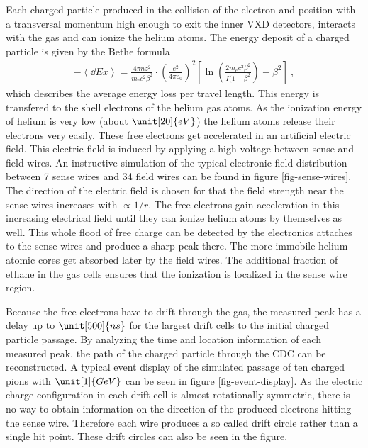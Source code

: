 Each charged particle produced in the collision of the electron and position with a transversal momentum high enough to exit the inner VXD detectors, interacts with the gas and can ionize the helium atoms. The energy deposit of a charged particle is given by the Bethe formula \cite{bethe}
\begin{align}
 - \left\langle \dd{E}{x} \right\rangle = \frac{4 \pi n z^2}{m_e c^2 \beta^2} \cdot \left( \frac{e^2}{4 \pi \varepsilon_0} \right)^2 \left[ \ln\left( \frac{2 m_e c^2 \beta^2}{I(1 - \beta^2} \right) - \beta^2 \right] \ , \label{form-bethe}
\end{align}
which describes the average energy loss per travel length. This energy is transfered to the shell electrons of the helium gas atoms. As the ionization energy of helium is very low (about $\unit[20]{eV}$) the helium atoms release their electrons very easily. These free electrons get accelerated in an artificial electric field. This electric field is induced by applying a high voltage between sense and field wires. An instructive simulation of the typical electronic field distribution between 7 sense wires and 34 field wires can be found in figure \ref{fig-sense-wires}. The direction of the electric field is chosen for that the field strength near the sense wires increases with $\propto 1/r$. The free electrons gain acceleration in this increasing  electrical field until they can ionize helium atoms by themselves as well. This whole flood of free charge can be detected by the electronics attaches to the sense wires and produce a sharp peak there. The more immobile helium atomic cores get absorbed later by the field wires. The additional fraction of ethane in the gas cells ensures that the ionization is localized in the sense wire region.

Because the free electrons have to drift through the gas, the measured peak has a delay up to $\unit[500]{ns}$ for the largest drift cells to the initial charged particle passage. By analyzing the time and location information of each measured peak, the path of the charged particle through the CDC can be reconstructed. A typical event display of the simulated passage of ten charged pions with $\unit[1]{GeV}$ can be seen in figure \ref{fig-event-display}. As the electric charge configuration in each drift cell is almost rotationally symmetric, there is no way to obtain information on the direction of the produced electrons hitting the sense wire. Therefore each wire produces a so called drift circle rather than a single hit point. These drift circles can also be seen in the figure.

